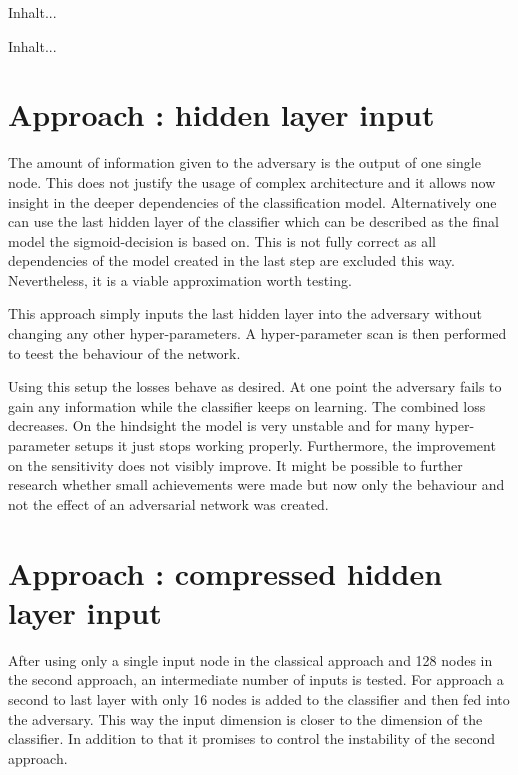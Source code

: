 
\begin{minipage}{.5\linewidth}
Inhalt...
\end{minipage}
\quad
\begin{minipage}{.5\linewidth}
Inhalt...
\end{minipage}

\section{Approach : hidden layer input}

The amount of information given to the adversary is the output of one single node. This does not justify the usage of complex architecture and it allows now insight in the deeper dependencies of the classification model. Alternatively one can use the last hidden layer of the classifier which can be described as the final model the sigmoid-decision is based on. This is not fully correct as all dependencies of the model created in the last step are excluded this way. Nevertheless, it is a viable approximation worth testing.

This approach simply inputs the last hidden layer into the adversary without changing any other hyper-parameters. A hyper-parameter scan is then performed to teest the behaviour of the network.


Using this setup the losses behave as desired. At one point the adversary fails to gain any information while the classifier keeps on learning. The combined loss decreases. On the hindsight the model is very unstable and for many hyper-parameter setups it just stops working properly. Furthermore, the improvement on the sensitivity does not visibly improve. It might be possible to further research whether small achievements were made but now only the behaviour and not the effect of an adversarial network was created.

\section{Approach : compressed hidden layer input}

After using only a single input node in the classical approach and \num{128} nodes in the second approach, an intermediate number of inputs is tested. For approach  a second to last layer with only \num{16} nodes is added to the classifier and then fed into the adversary. This way the input dimension is closer to the dimension of the classifier. In addition to that it promises to control the instability of the second approach.

